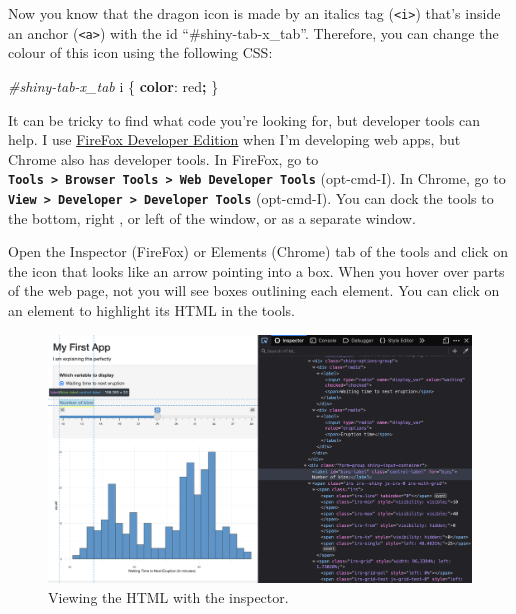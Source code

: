 \documentclass[
]{book}
\newenvironment{Shaded}{\begin{snugshade}}{\end{snugshade}}
\newcommand{\ConstantTok}[1]{\textcolor[rgb]{0.00,0.00,0.00}{#1}}
\newcommand{\KeywordTok}[1]{\textcolor[rgb]{0.13,0.29,0.53}{\textbf{#1}}}
\newcommand{\NormalTok}[1]{#1}
\newcommand{\OperatorTok}[1]{\textcolor[rgb]{0.81,0.36,0.00}{\textbf{#1}}}
\newcommand{\PreprocessorTok}[1]{\textcolor[rgb]{0.56,0.35,0.01}{\textit{#1}}}
\begin{document}
Now you know that the dragon icon is made by an italics tag (\texttt{\textless{}i\textgreater{}}) that's inside an anchor (\texttt{\textless{}a\textgreater{}}) with the id ``\#shiny-tab-x\_tab''. Therefore, you can change the colour of this icon using the following CSS:

\begin{Shaded}
\begin{Highlighting}[]
\PreprocessorTok{\#shiny{-}tab{-}x\_tab}\NormalTok{ i \{ }\KeywordTok{color}\NormalTok{: }\ConstantTok{red}\OperatorTok{;}\NormalTok{ \}}
\end{Highlighting}
\end{Shaded}

It can be tricky to find what code you're looking for, but developer tools can help. I use \href{https://www.mozilla.org/en-US/firefox/developer/}{FireFox Developer Edition} when I'm developing web apps, but Chrome also has developer tools. In FireFox, go to \textbf{\texttt{Tools\ \textgreater{}\ Browser\ Tools\ \textgreater{}\ Web\ Developer\ Tools}} (opt-cmd-I). In Chrome, go to \textbf{\texttt{View\ \textgreater{}\ Developer\ \textgreater{}\ Developer\ Tools}} (opt-cmd-I). You can dock the tools to the bottom, right , or left of the window, or as a separate window.

Open the Inspector (FireFox) or Elements (Chrome) tab of the tools and click on the icon that looks like an arrow pointing into a box. When you hover over parts of the web page, not you will see boxes outlining each element. You can click on an element to highlight its HTML in the tools.

\begin{figure}

{\centering \includegraphics[width=1\linewidth]{images/inspector} 

}

\caption{Viewing the HTML with the inspector.}\label{fig:inspector}
\end{figure}
\end{document}
